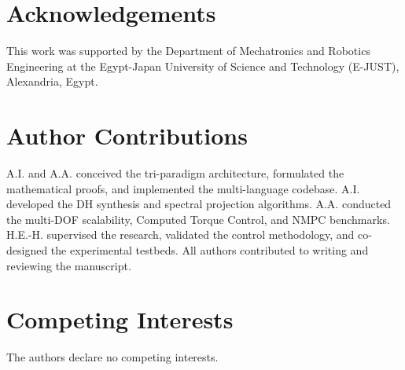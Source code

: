 \documentclass[fleqn,10pt]{article}
\begin{document}
	\section*{Acknowledgements}
	This work was supported by the Department of Mechatronics and Robotics Engineering at the Egypt-Japan University of Science and Technology (E-JUST), Alexandria, Egypt.
	
	\section*{Author Contributions}
	A.I. and A.A. conceived the tri-paradigm architecture, formulated the mathematical proofs, and implemented the multi-language codebase. A.I. developed the DH synthesis and spectral projection algorithms. A.A. conducted the multi-DOF scalability, Computed Torque Control, and NMPC benchmarks. H.E.-H. supervised the research, validated the control methodology, and co-designed the experimental testbeds. All authors contributed to writing and reviewing the manuscript.
	
	\section*{Competing Interests}
	The authors declare no competing interests.
	
\end{document}
